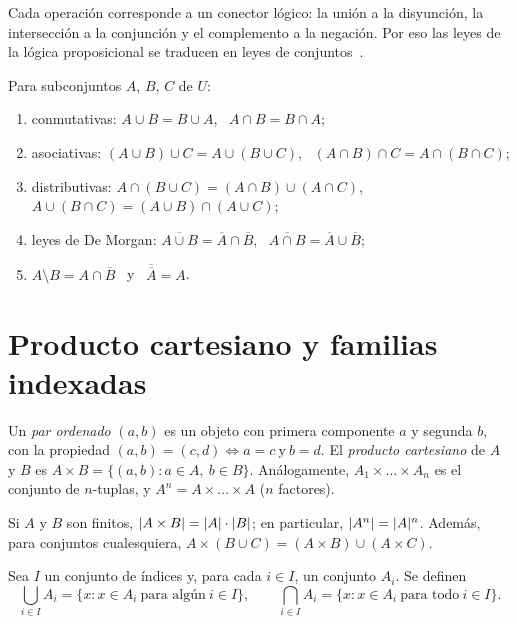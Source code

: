 Cada operación corresponde a un conector lógico: la unión a la disyunción, la intersección a la conjunción y el complemento a la negación. Por eso las leyes de la lógica proposicional se traducen en leyes de conjuntos~\cite[§1.4]{velleman}.

\begin{teorema}\label{teo:t1-leyes}
Para subconjuntos $A$, $B$, $C$ de $U$:
\begin{enumerate}
  \item conmutativas: $A\cup B=B\cup A$, \ $A\cap B=B\cap A$;
  \item asociativas: $(A\cup B)\cup C=A\cup(B\cup C)$, \ $(A\cap B)\cap C=A\cap(B\cap C)$;
  \item distributivas: $A\cap(B\cup C)=(A\cap B)\cup(A\cap C)$, \ $A\cup(B\cap C)=(A\cup B)\cap(A\cup C)$;
  \item leyes de De Morgan: $\overline{A\cup B}=\overline{A}\cap\overline{B}$, \ $\overline{A\cap B}=\overline{A}\cup\overline{B}$;
  \item $A\setminus B=A\cap\overline{B}$ \ y \ $\overline{\overline{A}}=A$.
\end{enumerate}
\end{teorema}

\addtocounter{figure}{1}%

\addtocounter{definicion}{1}%

\addtocounter{definicion}{1}%

\section{Producto cartesiano y familias indexadas}

\begin{definicion}
Un \emph{par ordenado} $(a,b)$ es un objeto con primera componente $a$ y segunda $b$, con la propiedad $(a,b)=(c,d)\iff a=c\ \text{y}\ b=d$. El \emph{producto cartesiano} de $A$ y $B$ es $A\times B=\{(a,b): a\in A,\ b\in B\}$. Análogamente, $A_1\times\dots\times A_n$ es el conjunto de $n$-tuplas, y $A^{n}=A\times\dots\times A$ ($n$ factores).
\end{definicion}

\begin{proposicion}\label{prop:t1-producto}
Si $A$ y $B$ son finitos, $\lvert A\times B\rvert=\lvert A\rvert\cdot\lvert B\rvert$; en particular, $\lvert A^{n}\rvert=\lvert A\rvert^{n}$. Además, para conjuntos cualesquiera, $A\times(B\cup C)=(A\times B)\cup(A\times C)$.
\end{proposicion}

\addtocounter{definicion}{1}%

\begin{definicion}
Sea $I$ un conjunto de índices y, para cada $i\in I$, un conjunto $A_i$. Se definen
\[
\bigcup_{i\in I}A_i=\{x : x\in A_i\ \text{para algún}\ i\in I\},\qquad
\bigcap_{i\in I}A_i=\{x : x\in A_i\ \text{para todo}\ i\in I\}.
\]
\end{definicion}

\addtocounter{definicion}{1}%

\addtocounter{definicion}{1}%

